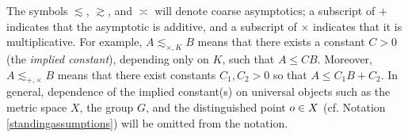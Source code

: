 

\begin{convention}
\label{conventionimplied}
The symbols $\lesssim$, $\gtrsim$, and $\asymp$ will denote coarse asymptotics; a subscript of $\plus$ indicates that the asymptotic is additive, and a subscript of $\times$ indicates that it is multiplicative. For example, $A\lesssim_{\times,K} B$ means that there exists a constant $C > 0$ (the \emph{implied constant}\label{pageimpliedconstant}), depending only on $K$, such that $A\leq C B$. Moreover, $A\lesssim_{\plus,\times}B$ means that there exist constants $C_1,C_2 > 0$ so that $A\leq C_1 B + C_2$. In general, dependence of the implied constant(s) on universal objects such as the metric space $X$, the group $G$, and the distinguished point $o\in X$ (cf. Notation \ref{standingassumptions}) will be omitted from the notation.
\end{convention}

